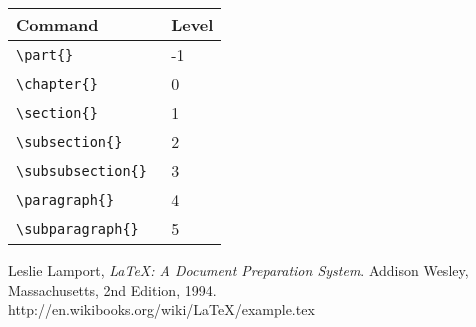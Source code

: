 \documentclass{article}
\begin{document}

\begin{center}
  \begin{tabular}{|l|l|}
    \hline
    Command & Level \\ \hline
    \verb|\part{}| & -1 \\
    \verb|\chapter{}| & 0 \\
    \verb|\section{}| & 1 \\
    \verb|\subsection{}| & 2 \\
    \verb|\subsubsection{} | & 3 \\
    \verb|\paragraph{} | & 4 \\
    \verb|\subparagraph{} | & 5 \\
    \hline
  \end{tabular}
\end{center}
\begin{thebibliography}{99}
  Leslie Lamport,
  \emph{\LaTeX: A Document Preparation System}.
  Addison Wesley, Massachusetts,
  2nd Edition,
  1994.
  http://en.wikibooks.org/wiki/LaTeX/example.tex
\end{thebibliography}
\end{document}
